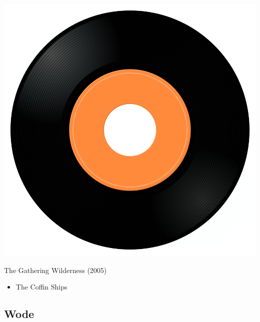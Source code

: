 \begin{minipage}[t]{0.25\textwidth}
\captionsetup{type=figure}
\includegraphics[width=\textwidth]{Images/cover.png}
\caption*{The Gathering Wilderness (2005)}
\end{minipage}
\begin{minipage}[t]{0.25\textwidth}\vspace{0pt}
\begin{itemize}[nosep,leftmargin=1em,labelwidth=*,align=left]
	\setlength{\itemsep}{0pt}
	\item The Coffin Ships
\end{itemize}
\end{minipage}

\subsection{Wode}

